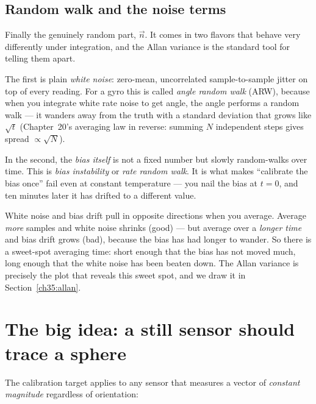 \subsection{Random walk and the noise terms}
\label{ch35:random-walk}

Finally the genuinely random part, $\vec{n}$. It comes in two flavors that
behave very differently under integration, and the Allan variance is the
standard tool for telling them apart.

The first is plain \emph{white noise}: zero-mean, uncorrelated sample-to-sample
jitter on top of every reading. For a gyro this is called \emph{angle random
walk} (ARW), because when you integrate white rate noise to get angle, the angle
performs a random walk --- it wanders away from the truth with a standard
deviation that grows like $\sqrt{t}$ (Chapter~20's averaging law in reverse:
summing $N$ independent steps gives spread $\propto\sqrt{N}$).

In the second, the \emph{bias itself} is not a fixed number but slowly
random-walks over time. This is \emph{bias instability} or \emph{rate random
walk}. It is what makes ``calibrate the bias once'' fail even at constant
temperature --- you nail the bias at $t=0$, and ten minutes later it has
drifted to a different value.

\begin{intuitionbox}
White noise and bias drift pull in opposite directions when you average. Average
\emph{more} samples and white noise shrinks (good) --- but average over a
\emph{longer time} and bias drift grows (bad), because the bias has had longer to
wander. So there is a sweet-spot averaging time: short enough that the bias has
not moved much, long enough that the white noise has been beaten down. The Allan
variance is precisely the plot that reveals this sweet spot, and we draw it in
Section~\ref{ch35:allan}.
\end{intuitionbox}

\section{The big idea: a still sensor should trace a sphere}
\label{ch35:sphere-idea}

The calibration target applies to any sensor that measures a vector of \emph{constant magnitude} regardless of orientation:

